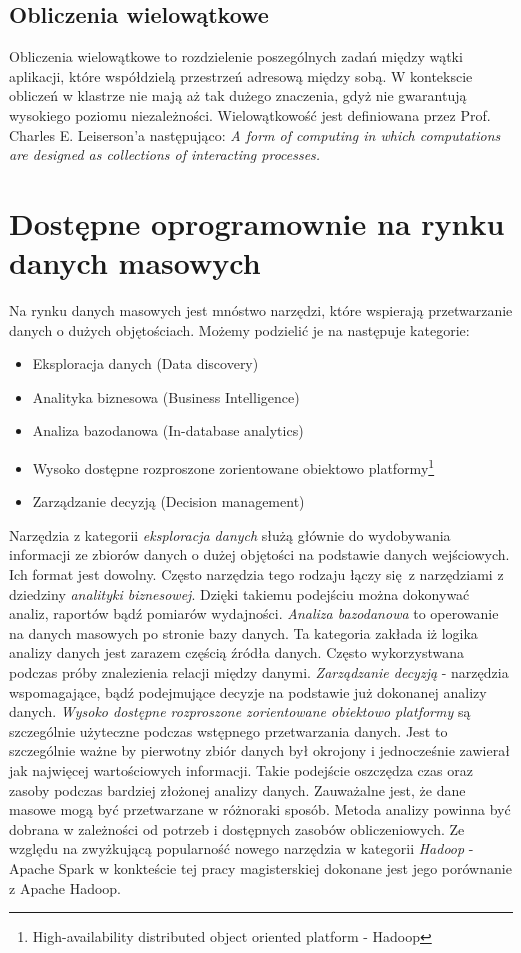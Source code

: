 \subsection{Obliczenia wielowątkowe}
Obliczenia wielowątkowe to rozdzielenie poszególnych zadań między wątki aplikacji, które współdzielą przestrzeń adresową między sobą. W kontekscie obliczeń w klastrze nie mają aż tak dużego znaczenia, gdyż nie gwarantują wysokiego poziomu niezależności. Wielowątkowość jest definiowana przez Prof. Charles E. Leiserson'a następująco: 
\newline \textit{A form of computing in which computations are designed as collections of interacting processes.}\cite{mit_presentation}
\section{Dostępne oprogramownie na rynku danych masowych}
Na rynku danych masowych jest mnóstwo narzędzi, które wspierają przetwarzanie danych o dużych objętościach. Możemy podzielić je na następuje kategorie:
\begin{itemize}
	\item Eksploracja danych (Data discovery)
	\item Analityka biznesowa (Business Intelligence)
	\item Analiza bazodanowa (In-database analytics)
	\item Wysoko dostępne rozproszone zorientowane obiektowo platformy\footnote{High-availability distributed	object oriented platform - Hadoop}
	\item Zarządzanie decyzją (Decision management)    
\end{itemize}
Narzędzia z kategorii \textit{eksploracja danych} służą głównie do wydobywania informacji ze zbiorów danych o dużej objętości na podstawie danych wejściowych. Ich format jest dowolny. Często narzędzia tego rodzaju łączy się z narzędziami z dziedziny \textit{analityki biznesowej}. Dzięki takiemu podejściu można dokonywać analiz, raportów bądź pomiarów wydajności. \textit{Analiza bazodanowa} to operowanie na danych masowych po stronie bazy danych. Ta kategoria zakłada iż logika analizy danych jest zarazem częścią źródła danych. Często wykorzystwana podczas próby znalezienia relacji między danymi. \textit{Zarządzanie decyzją} - narzędzia wspomagające, bądź podejmujące decyzje na podstawie już dokonanej analizy danych. \textit{Wysoko dostępne rozproszone zorientowane obiektowo platformy} są szczególnie użyteczne podczas wstępnego przetwarzania danych. Jest to szczególnie ważne by pierwotny zbiór danych był okrojony i jednocześnie zawierał jak najwięcej wartościowych informacji. Takie podejście oszczędza czas oraz zasoby podczas bardziej złożonej analizy danych.\cite{big_data_tools}
\newline Zauważalne jest, że dane masowe mogą być przetwarzane w różnoraki sposób. Metoda analizy powinna być dobrana w zależności od potrzeb i dostępnych zasobów obliczeniowych. Ze względu na zwyżkującą popularność nowego narzędzia w kategorii \textit{Hadoop} - Apache Spark w konkteście tej pracy magisterskiej dokonane jest jego porównanie z Apache Hadoop.\cite{databricks_survey}  
